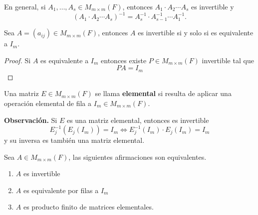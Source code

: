 \documentclass[12pt,a4paper]{book}
\begin{document}
    En general, si $A_{1},\dots,A_{s}\in M_{m\times m}(F)$, entonces $A_{1}\cdot A_{2}\cdots A_{s}$
    es invertible y
    \begin{equation*}
        (A_{1}\cdot A_{2}\cdots A_{s})^{-1}=A_{s}^{-1}\cdot A_{s-1}^{-1}\cdots A_{1}^{-1}.
    \end{equation*}

    \begin{proposicion}
    \label{prop:11}
        Sea $A=(a_{ij})\in M_{m\times m}(F)$, entonces $A$ es invertible si y solo si es
        equivalente a $I_{m}$.
    \end{proposicion}

    \begin{proof}
        Si $A$ es equivalente a $I_{m}$ entonces existe $P\in M_{m\times m}(F)$ invertible tal que
        \begin{equation*}
            PA=I_{m}
        \end{equation*}
    \end{proof}

    \begin{definicion}
    \label{def:10}
        Una matriz $E\in M_{m\times m}(F)$ se llama \textbf{elemental} si resulta de aplicar una
        operación elemental de fila a $I_{m}\in M_{m\times m}(F)$.
    \end{definicion}

    \textbf{Observación.} Si $E$ es una matriz elemental, entonces es invertible
    \begin{equation*}
        E_{j}^{-1}(E_{j}(I_{m}))=I_{m}\Longleftrightarrow E_{j}^{-1}(I_{m})\cdot E_{j}(I_{m})=I_{m}
    \end{equation*}
    y su inversa es también una matriz elemental.

    \begin{teorema}
    \label{teo:3}
        Sea $A\in M_{m\times m}(F)$, las siguientes afirmaciones son equivalentes.
        \begin{enumerate}
            \item[$(i)$] $A$ es invertible
            \item[$(ii)$] $A$ es equivalente por filas a $I_{m}$
            \item[$(iii)$] $A$ es producto finito de matrices elementales.  
        \end{enumerate}
    \end{teorema}
\end{document}
